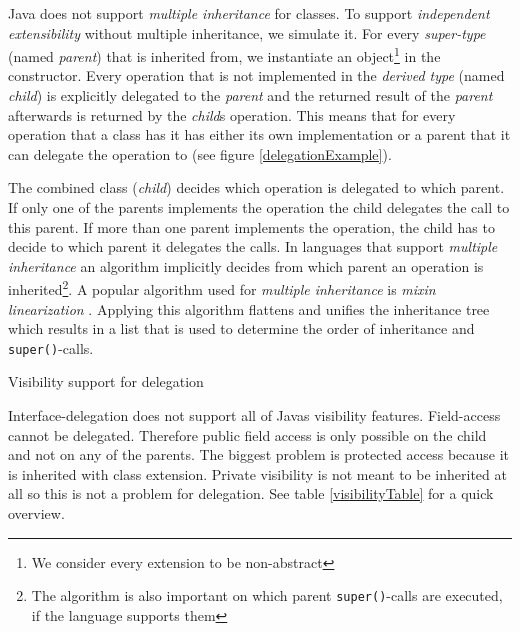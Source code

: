 \documentclass{report}
\begin{document}
Java does not support \emph{multiple inheritance} for classes. To support \emph{independent extensibility} without multiple inheritance, we simulate it. For every \emph{super-type} (named \emph{parent}) that is inherited from, we instantiate an object\footnote{We consider every extension to be non-abstract} in the constructor. Every operation that is not implemented in the \emph{derived type} (named \emph{child}) is explicitly delegated to the \emph{parent} and the returned result of the \emph{parent} afterwards is returned by the \emph{child}s operation. This means that for every operation that a class has it has either its own implementation or a parent that it can delegate the operation to (see figure \ref{delegationExample}).

The combined class (\emph{child}) decides which operation is delegated to which parent. If only one of the parents implements the operation the child delegates the call to this parent. If more than one parent implements the operation, the child has to decide to which parent it delegates the calls. In languages that support \emph{multiple inheritance} an algorithm implicitly decides from which parent an operation is inherited\footnote{The algorithm is also important on which parent \lstinline{super()}-calls are executed, if the language supports them}. A popular algorithm used for \emph{multiple inheritance} is \emph{mixin linearization} \cite{Bracha-Mixin-1990}. Applying this algorithm flattens and unifies the inheritance tree which results in a list that is used to determine the order of inheritance and \lstinline{super()}-calls.


\begin{table}
\def\arraystretch{1.2}
\setlength\fboxsep{0.6pt}
\centering
{}
\caption{Visibility support for delegation}
\label{visibilityTable}
\end{table}
Interface-delegation does not support all of Javas visibility features. Field-access cannot be delegated. Therefore public field access is only possible on the child and not on any of the parents. The biggest problem is protected access because it is inherited with class extension. Private visibility is not meant to be inherited at all so this is not a problem for delegation. See table \ref{visibilityTable} for a quick overview.
\end{document}
